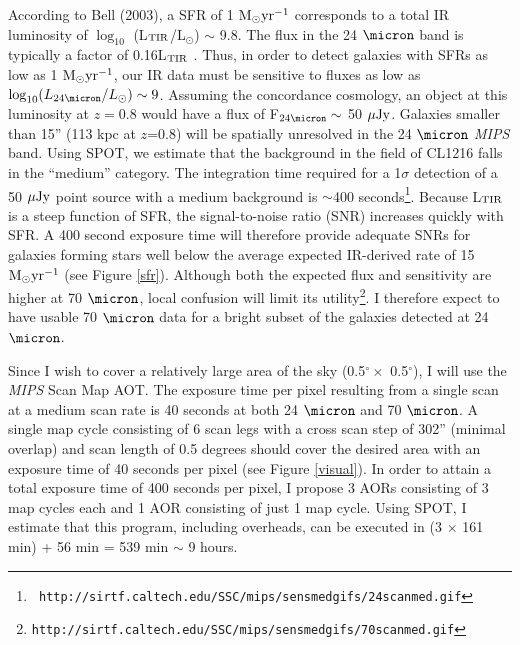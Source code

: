 \documentclass[12pt]{plan}
\begin{document}
According to Bell (2003)\cite{Bell03}, a SFR of 1 ${\rm M}_{\odot}
{\rm yr}^{-1}$ corresponds to a total IR luminosity of $\log_{10}$
(L$_{{\rm TIR}}$/L$_{\odot}$) $\sim$ 9.8.  The flux in the 24
$\micron$ band is typically a factor of 0.16L$_{{\rm TIR}}$
\cite{Papovich02}.  Thus, in order to detect galaxies with SFRs as low
as 1 ${\rm M}_{\odot} {\rm yr}^{-1}$, our IR data must be sensitive to
fluxes as low as $\log_{10}(L_{24 \micron} / L_{\odot}) \sim 9$.
Assuming the concordance cosmology, an object at this luminosity at
$z=0.8$ would have a flux of F$_{24 \micron} \sim$ 50 $\mu {\rm Jy}$.
Galaxies smaller than 15'' (113 kpc at $z$=0.8) will be spatially
unresolved in the 24 $\micron$ {\em MIPS} band.  Using SPOT, we
estimate that the background in the field of CL1216 falls in the
``medium'' category.  The integration time required for a 1$\sigma$
detection of a 50 $\mu {\rm Jy}$ point source with a medium background
is $\sim$400 seconds\footnote{{\tt
http://sirtf.caltech.edu/SSC/mips/sensmedgifs/24scanmed.gif}}.
Because L$_{{\rm TIR}}$ is a steep function of SFR, the
signal-to-noise ratio (SNR) increases quickly with SFR.  A 400 second
exposure time will therefore provide adequate SNRs for galaxies
forming stars well below the average expected IR-derived rate of 15
${\rm M}_{\odot} {\rm yr}^{-1}$ (see Figure \ref{sfr}).  Although both
the expected flux and sensitivity are higher at 70 $\micron$,
local confusion will limit its utility\footnote{{\tt http://sirtf.caltech.edu/SSC/mips/sensmedgifs/70scanmed.gif}}.  I therefore expect to have
usable 70 $\micron$ data for a bright subset of the galaxies detected
at 24 $\micron$.

Since I wish to cover a relatively large area of the sky (0.5$^\circ
\times$ 0.5$^\circ$), I will use the \emph{MIPS} Scan Map AOT.  The
exposure time per pixel resulting from a single scan at a medium scan
rate is 40 seconds at both 24 $\micron$ and 70 $\micron$.  A single map
cycle consisting of 6 scan legs with a cross scan step of 302''
(minimal overlap) and scan length of 0.5 degrees should cover the desired area with an exposure time of 40 seconds per pixel (see Figure
\ref{visual}).  In order to attain a total exposure time of 400
seconds per pixel, I propose 3 AORs consisting of 3 map cycles each
and 1 AOR consisting of just 1 map cycle.  Using SPOT, I estimate that
this program, including overheads, can be executed in (3 $\times$ 161
min) + 56 min = 539 min $\sim$ 9 hours.

\vspace{-3mm}
\end{document}
